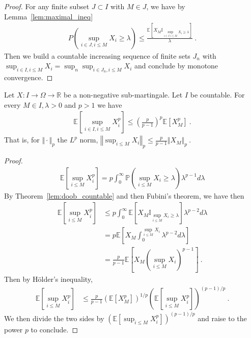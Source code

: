 \begin{proof}
For any finite subset $J \subset I$ with $M \in J$, we have by Lemma~\ref{lem:maximal_ineq}
\begin{align*}
  P\left( \sup_{i\in J, i \le M}X_i\geq\lambda \right)
  \le \frac{\mathbb{E}\left[X_{M} \mathbb{I}_{\sup_{i \in J, i \le M}X_i \ge \lambda}\right]}{\lambda}
  \: .
\end{align*}
Then we build a countable increasing sequence of finite sets $J_n$ with $\sup_{i\in I, i\leq M}X_i = \sup_n\sup_{i\in J_n, i \le M}X_i$ and conclude by monotone convergence.
\end{proof}


\begin{lemma}\label{lem:doob_Lp_countable}
  Let $X : I \rightarrow \Omega \rightarrow \mathbb{R}$ be a non-negative sub-martingale. Let $I$ be countable.
  For every $M\in I,\lambda > 0$ and $p>1$ we have
  \begin{align*}
    \mathbb{E}\left[ \sup_{i\in I, i \leq M}X_i^p \right]
    \leq \left(\frac{p}{p-1}\right)^p\mathbb{E}[X_M^p]
    \: .
  \end{align*}
  That is, for $\Vert \cdot \Vert_p$ the $L^p$ norm,
  $\left\Vert \sup_{i \le M}  X_i  \right\Vert_p
    \leq \frac{p}{p-1} \left\Vert X_M \right\Vert_p
    \: .$
\end{lemma}

\begin{proof}
\begin{align*}
  \mathbb{E}\left[ \sup_{i \le M}X_i^p \right]
  = p \int_0^\infty \mathbb{P}\left( \sup_{i \le M}X_i \geq \lambda \right) \lambda^{p-1} d\lambda
\end{align*}
By Theorem~\ref{lem:doob_countable} and then Fubini's theorem, we have then
\begin{align*}
  \mathbb{E}\left[ \sup_{i \le M}X_i^p \right]
  &\le p \int_0^\infty \mathbb{E}\left[X_M \mathbb{I}_{\sup_{i \le M}X_i \ge \lambda}\right] \lambda^{p-2} d\lambda
  \\
  &= p \mathbb{E}\left[X_M \int_0^{\sup_{i \le M}X_i} \lambda^{p-2} d\lambda\right]
  \\
  &= \frac{p}{p - 1} \mathbb{E}\left[X_M (\sup_{i \le M}X_i)^{p-1}\right]
  \: .
\end{align*}
Then by Hölder's inequality,
\begin{align*}
  \mathbb{E}\left[ \sup_{i \le M}X_i^p \right]
  &\le \frac{p}{p - 1} \left(\mathbb{E}[X_M^p]\right)^{1/p} \left(\mathbb{E}\left[\sup_{i \le M}X_i^p \right]\right)^{(p-1)/p}
  \: .
\end{align*}
We then divide the two sides by $\left(\mathbb{E}\left[\sup_{i \le M}X_i^p \right]\right)^{(p-1)/p}$ and raise to the power $p$ to conclude.
\end{proof}


